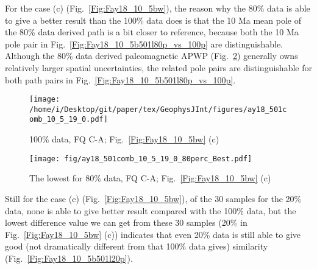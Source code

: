 For the case (c) (Fig.~\ref{Fig:Fay18_10_5bw}), the reason why the 80\% data is
able to give a better result than the 100\% data does is that the 10 Ma mean
pole of the 80\% data derived path is a bit closer to reference, because both
the 10 Ma pole pair in Fig.~\ref{Fig:Fay18_10_5b501l80p_vs_100p} are
distinguishable. Although the 80\% data derived paleomagnetic APWP
(Fig.~\ref{Fig:Fay18_10_5b501l80p}) generally owns relatively larger spatial
uncertainties, the related pole pairs are distinguishable for both path pairs in
Fig.~\ref{Fig:Fay18_10_5b501l80p_vs_100p}.

\begin{figure*}[tbp]
  \captionsetup[subfigure]{labelformat=empty,aboveskip=-6pt,belowskip=-6pt}
  \centering
  \begin{subfigure}[htbp]{.49\textwidth}
    \captionsetup{skip=0pt}
    \centering
    \texttt{[image: /home/i/Desktop/git/paper/tex/GeophysJInt/figures/ay18\_501comb\_10\_5\_19\_0.pdf]}
	\caption{100\% data, FQ C-A; Fig.~\ref{Fig:Fay18_10_5bw}
	(c)}\label{Fig:Fay18_10_5b501}
  \end{subfigure}
  \begin{subfigure}[htbp]{.49\textwidth}
    \captionsetup{skip=0pt}
    \centering
    \texttt{[image: fig/ay18\_501comb\_10\_5\_19\_0\_80perc\_Best.pdf]}  %
    \caption{The lowest for 80\% data, FQ C-A;
	Fig.~\ref{Fig:Fay18_10_5bw} (c)}\label{Fig:Fay18_10_5b501l80p}
  \end{subfigure}
  \caption[Less data, better similarity?]{Comparing the 100\% Indian
  120 Ma paleomagnetic data derived result with the best of the only
  80\% data (giving even better similarity) derived results (the green dot in
  Fig.~\ref{Fig:Fay18_10_5bw} (c)).}\label{Fig:Fay18_10_5b501l80p_vs_100p}
\end{figure*}

Still for the case (c) (Fig.~\ref{Fig:Fay18_10_5bw}), of the 30 samples for the
20\% data, none is able to give better result compared with the 100\% data, but
the lowest difference value we can get from these 30 samples (20\% in
Fig.~\ref{Fig:Fay18_10_5bw} (c)) indicates that even 20\% data is still able to
give good (not dramatically different from that 100\% data gives) similarity
(Fig.~\ref{Fig:Fay18_10_5b501l20p}).

